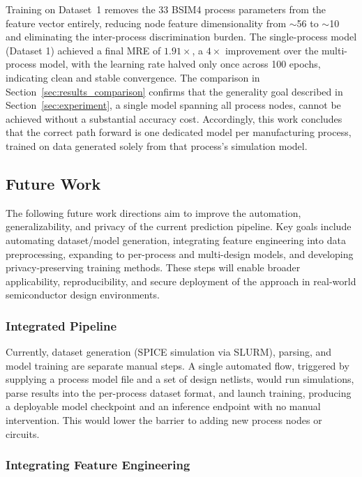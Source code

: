 \documentclass[10pt,twocolumn,letterpaper]{article}
\begin{document}
Training on Dataset~1 removes the 33 BSIM4 process parameters from the feature vector entirely, reducing node feature dimensionality from $\sim$56 to $\sim$10 and eliminating the inter-process discrimination burden. The single-process model (Dataset 1) achieved a final MRE of $1.91\times$, a $4\times$ improvement over the multi-process model, with the learning rate halved only once across 100 epochs, indicating clean and stable convergence. The comparison in Section~\ref{sec:results_comparison} confirms that the generality goal described in Section~\ref{sec:experiment}, a single model spanning all process nodes, cannot be achieved without a substantial accuracy cost. Accordingly, this work concludes that the correct path forward is one dedicated model per manufacturing process, trained on data generated solely from that process's simulation model.

\subsection{Future Work}
\label{subsec:future_work}

The following future work directions aim to improve the automation, generalizability, and privacy of the current prediction pipeline. Key goals include automating dataset/model generation, integrating feature engineering into data preprocessing, expanding to per-process and multi-design models, and developing privacy-preserving training methods. These steps will enable broader applicability, reproducibility, and secure deployment of the approach in real-world semiconductor design environments.

\subsubsection{Integrated Pipeline}
\label{subsubsec:integrated_pipeline}

Currently, dataset generation (SPICE simulation via SLURM), parsing, and model training are separate manual steps. A single automated flow, triggered by supplying a process model file and a set of design netlists, would run simulations, parse results into the per-process dataset format, and launch training, producing a deployable model checkpoint and an inference endpoint with no manual intervention. This would lower the barrier to adding new process nodes or circuits.

\subsubsection{Integrating Feature Engineering}
\label{subsubsec:feature_label_integration}
\end{document}
